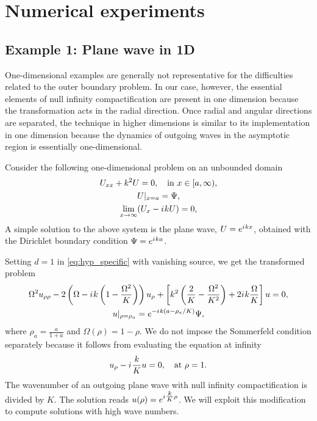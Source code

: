 \documentclass[final,onefignum,onetabnum]{siamart190516}
\newcommand{\iu}{{i\mkern1mu}}
\begin{document}
\section{Numerical experiments}\label{sec:numerical}
\subsection{Example 1: Plane wave in 1D}\label{sec:oned}
One-dimensional examples are generally not representative for the difficulties related to the outer boundary problem. In our case, however, the essential elements of null infinity compactification are present in one dimension because the transformation acts in the radial direction. Once radial and angular directions are separated, the technique in higher dimensions is similar to its implementation in one dimension because the dynamics of outgoing waves in the asymptotic region is essentially one-dimensional.

Consider the following one-dimensional problem on an unbounded domain
\begin{equation}
	\label{eq:oneD}
	\begin{gathered}
		U_{xx} + k^2 U = 0, \quad \mathrm{in} \ x\in[a,\infty),\\
		U|_{x=a} = \Psi,\\
		\lim_{x\to\infty} (U_x - \iu k U) = 0,
	\end{gathered}
\end{equation}
A simple solution to the above system is the plane wave, $U=e^{\iu k x}$, obtained with the Dirichlet boundary condition $\Psi=e^{\iu k a}$. 

Setting $d=1$ in \eqref{eq:hyp_specific} with vanishing source, we get the transformed problem
\begin{equation}
	\label{eq:hyp_1d}
	\begin{gathered}
		\Omega^2 u_{\rho\rho} - 2 \left(\Omega-\iu k \left(1-\frac{\Omega^2}{K}\right) \right) u_\rho + \left[k^2 \left(\frac{2}{K}-\frac{\Omega^2}{K^2}\right) + 2 \iu k \frac{\Omega}{K} \right] u = 0,\\
		u|_{\rho=\rho_a} = e^{-\iu k (a-\rho_a/K)}\Psi,
	\end{gathered}
\end{equation}
where $\rho_a=\tfrac{a}{1+a}$ and $\Omega(\rho)=1-\rho$. We do not impose the Sommerfeld condition separately because it follows from evaluating the equation at infinity 
\[ u_\rho - \iu \frac{k}{K} u = 0,   \quad \mathrm{at} \ \rho=1. \]
The wavenumber of an outgoing plane wave with null infinity compactification is divided by $K$. The solution reads $u(\rho)=e^{\iu \tfrac{k}{K} \rho}$. We will exploit this modification to compute solutions with high wave numbers.
\end{document}
